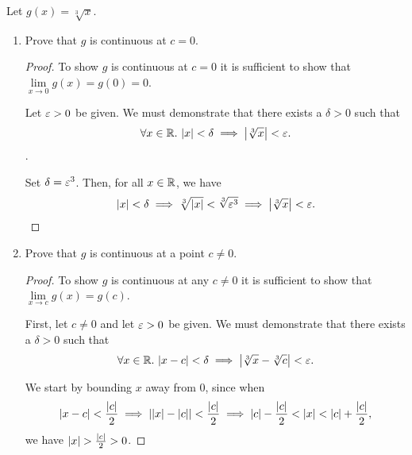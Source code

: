 \begin{problem}
  Let $g(x) = \sqrt[3]{x}$.
  \begin{enumerate}[label=(\alph*)]
    \item Prove that $g$ is continuous at $c = 0$.
      
      \begin{proof}
        To show $g$ is continuous at $c = 0$ it is sufficient to show that $\lim\limits_{x \to 0} g(x) = g(0) = 0$.

        Let $\varepsilon > 0$ be given. We must demonstrate that there exists a $\delta > 0$ such that
        \[
          \forall x \in \mathbb{R}.\, \left\lvert x \right\rvert < \delta \implies \left\lvert \sqrt[3]{x} \right\rvert < \varepsilon.
        \].

        Set $\delta = \varepsilon^{3}$. Then, for all $x \in \mathbb{R}$, we have
        \[
          \left\lvert x \right\rvert < \delta \implies \sqrt[3]{\left\lvert x \right\rvert} < \sqrt[3]{\varepsilon^{3}}  \implies \left\lvert \sqrt[3]{x} \right\rvert < \varepsilon.
        \]
      \end{proof}

    \item Prove that $g$ is continuous at a point $c \neq 0$.

      \begin{proof}
        To show $g$ is continuous at any $c \neq 0$ it is sufficient to show that $\lim\limits_{x \to c} g(x) = g(c)$.

        First, let $c \neq 0$ and let $\varepsilon > 0$ be given. We must demonstrate that there exists a $\delta > 0$ such that
        \[
          \forall x \in \mathbb{R}.\, \left\lvert x - c \right\rvert < \delta \implies \left\lvert \sqrt[3]{x} - \sqrt[3]{c} \right\rvert < \varepsilon.
        \]

        We start by bounding $x$ away from $0$, since when
        \begin{equation}
          \label{eq:factored-cbrts}
          \left\lvert x - c \right\rvert < \frac{\left\lvert c \right\rvert}{2} \implies \left\lvert \left\lvert x \right\rvert - \left\lvert c \right\rvert \right\rvert < \frac{\left\lvert c \right\rvert}{2} \implies \left\lvert c \right\rvert - \frac{\left\lvert c \right\rvert}{2} < \left\lvert x \right\rvert < \left\lvert c \right\rvert + \frac{\left\lvert c \right\rvert}{2},
        \end{equation}
        we have $\left\lvert x \right\rvert > \frac{\left\lvert c \right\rvert}{2} > 0$.
        

\end{proof}
\end{enumerate}
\end{problem}
